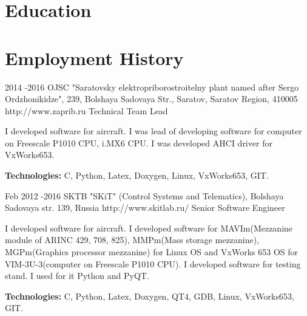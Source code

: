 
\section{Education}



\section{Employment History}

\job
{2014 -}{2016}
{OJSC "Saratovsky elektropriborostroitelny plant named after Sergo Ordzhonikidze", 239, Bolshaya Sadovaya Str., Saratov, Saratov Region, 410005}
{http://www.zaprib.ru}
{Technical Team Lead}
{I developed software for aircraft. I was lead of developing software for computer on Freescale P1010 CPU, i.MX6 CPU. I was developed AHCI driver for VxWorks653.\\
\rule{0mm}{5mm}\textbf{Technologies:} C, Python, Latex, Doxygen, Linux, VxWorks653, GIT.}


\job
{Feb 2012 -}{2016}
{SKTB "SKiT" (Control Systems and Telematics), Bolshaya Sadovaya str. 139, Russia}
{http://www.skitlab.ru/}
{Senior Software Engineer}
{I developed software for aircraft. I developed software for MAVIm(Mezzanine module of ARINC 429, 708, 825), MMPm(Mass storage mezzanine), MGPm(Graphics processor mezzanine) for Linux OS and VxWorks 653 OS for VIM-3U-3(computer on Freescale P1010 CPU). I developed software for testing stand. I used for it Python and PyQT.\\
\rule{0mm}{5mm}\textbf{Technologies:} C, Python, Latex, Doxygen, QT4, GDB, Linux, VxWorks653, GIT.}

